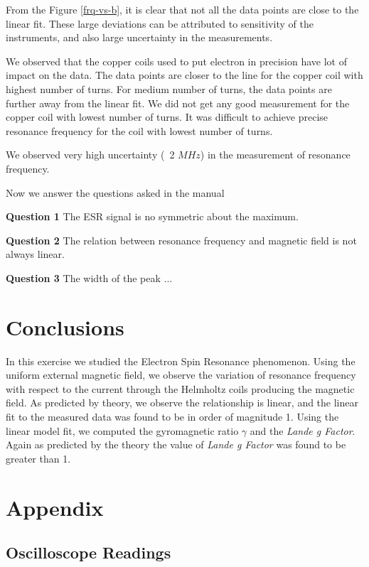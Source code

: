 \documentclass[letterpaper,12pt]{article}
\begin{document}
From the Figure \ref{frq-vs-b}, it is clear that not all the data points are close to the linear fit. These large 
deviations can be attributed to sensitivity of the instruments, and also large uncertainty in the measurements.

We observed that the copper coils used to put electron in precision have lot of impact on the data. The data points 
are closer to the line for the copper coil with highest number of turns. For medium number of turns, the 
data points are further away from the linear fit. We did not get any good measurement for the copper coil with lowest
number of turns. It was difficult to achieve precise resonance frequency for the coil with lowest number of turns.

We observed very high uncertainty (~2 $MHz$) in the measurement of resonance frequency.

Now we answer the questions asked in the manual

\textbf{Question 1}
The ESR signal is no symmetric about the maximum. 

\textbf{Question 2}
The relation between resonance frequency and magnetic field is not always linear.

\textbf{Question 3}
The width of the peak ...

\section{Conclusions}
In this exercise we studied the Electron Spin Resonance phenomenon. Using the uniform external magnetic 
field, we observe the variation of resonance frequency with respect to the current through the Helmholtz coils
producing the magnetic field. As predicted by theory, we observe the relationship is linear, and the linear
fit to the measured data was found to be in order of magnitude 1. Using the linear model fit, we 
computed the gyromagnetic ratio $\gamma$ and the \emph{Lande g Factor}. Again as predicted by the theory 
the value of \emph{Lande g Factor} was found to be greater than 1.


\pagebreak

\appendix

\section{Appendix}

\subsection{Oscilloscope Readings}
\end{document}
